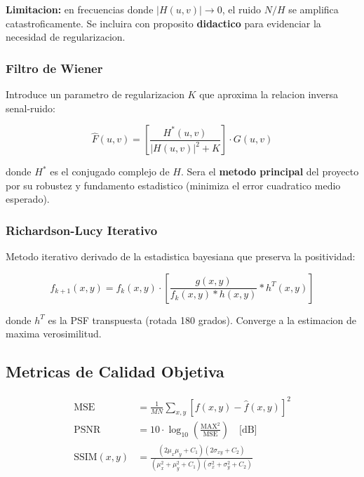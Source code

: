 \documentclass[11pt,a4paper]{article}
\begin{document}
\textbf{Limitacion:} en frecuencias donde $|H(u,v)| \to 0$, el ruido $N/H$ se amplifica catastroficamente. Se incluira con proposito \textbf{didactico} para evidenciar la necesidad de regularizacion.

\subsubsection{Filtro de Wiener}

Introduce un parametro de regularizacion $K$ que aproxima la relacion inversa senal-ruido:

\begin{equation}
\boxed{\; \hat{F}(u,v) = \left[ \frac{H^*(u,v)}{|H(u,v)|^2 + K} \right] \cdot G(u,v) \;}
\end{equation}

donde $H^*$ es el conjugado complejo de $H$. Sera el \textbf{metodo principal} del proyecto por su robustez y fundamento estadistico (minimiza el error cuadratico medio esperado).

\subsubsection{Richardson-Lucy Iterativo}

Metodo iterativo derivado de la estadistica bayesiana que preserva la positividad:

\begin{equation}
f_{k+1}(x,y) = f_k(x,y) \cdot \left[ \frac{g(x,y)}{f_k(x,y) * h(x,y)} * h^T(x,y) \right]
\end{equation}

donde $h^T$ es la PSF transpuesta (rotada 180 grados). Converge a la estimacion de maxima verosimilitud.

\subsection{Metricas de Calidad Objetiva}

\begin{align}
\text{MSE} &= \frac{1}{MN} \sum_{x,y} [f(x,y) - \hat{f}(x,y)]^2 \\[0.3em]
\text{PSNR} &= 10 \cdot \log_{10}\left( \frac{\text{MAX}^2}{\text{MSE}} \right) \quad \text{[dB]} \\[0.3em]
\text{SSIM}(x,y) &= \frac{(2\mu_x\mu_y + C_1)(2\sigma_{xy} + C_2)}{(\mu_x^2 + \mu_y^2 + C_1)(\sigma_x^2 + \sigma_y^2 + C_2)}
\end{align}
\end{document}
